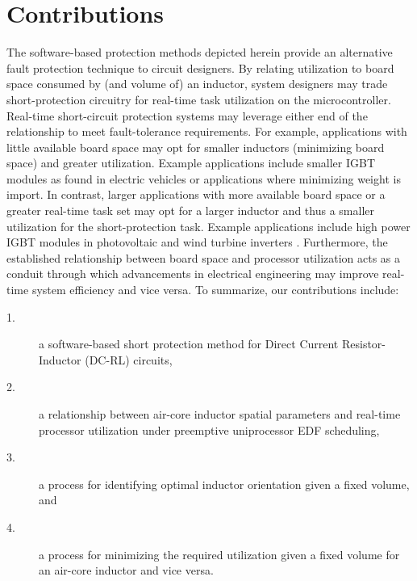 \documentclass[11pt,compsoc,oneside]{report}
\begin{document}
\section{Contributions}
The software-based protection methods depicted herein provide an alternative fault protection technique to circuit designers. By relating utilization to board space consumed by (and volume of) an inductor, system designers may trade short-protection circuitry for real-time task utilization on the microcontroller. Real-time short-circuit protection systems may leverage either end of the relationship to meet fault-tolerance requirements. For example, applications with little available board space may opt for smaller inductors (minimizing board space) and greater utilization. Example applications include smaller IGBT modules as found in electric vehicles or applications where minimizing weight is import\cite{IGBTvehicle}. In contrast, larger applications with more available board space or a greater real-time task set may opt for a larger inductor and thus a smaller utilization for the short-protection task. Example applications include high power IGBT modules in photovoltaic and wind turbine inverters \cite{photoVoltaic}\cite{hiPowerIGBTwind}. Furthermore, the established relationship between board space and processor utilization acts as a conduit through which advancements in electrical engineering may improve real-time system efficiency and vice versa.
To summarize, our contributions include:%
\begin{description}
\item [1.] a software-based short protection method for Direct Current Resistor-Inductor (DC-RL) circuits,
\item [2.] a relationship between air-core inductor spatial parameters and real-time processor utilization under preemptive uniprocessor EDF scheduling,
\item [3.] a process for identifying optimal inductor orientation given a fixed volume, and
\item [4.] a process for minimizing the required utilization given a fixed volume for an air-core inductor and vice versa.
\end{description}


\end{document}

